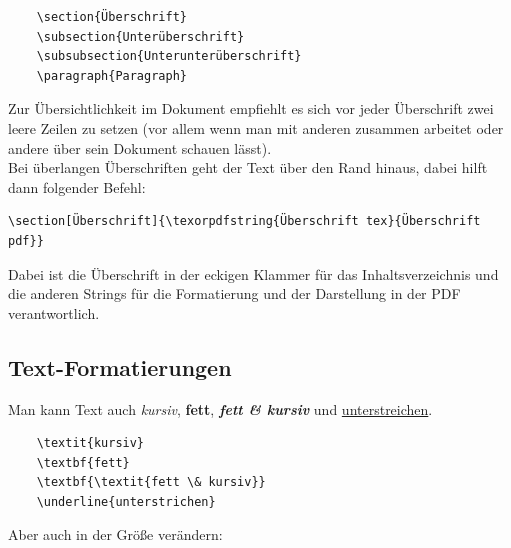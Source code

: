 \begin{verbatim}
    \section{Überschrift}
    \subsection{Unterüberschrift}
    \subsubsection{Unterunterüberschrift}
    \paragraph{Paragraph}
\end{verbatim}

Zur Übersichtlichkeit im Dokument empfiehlt es sich vor jeder Überschrift zwei leere Zeilen zu setzen (vor allem wenn man mit anderen zusammen arbeitet oder andere über sein Dokument schauen lässt).\\

Bei überlangen Überschriften geht der Text über den Rand hinaus, dabei hilft dann folgender Befehl:

\begin{verbatim}
\section[Überschrift]{\texorpdfstring{Überschrift tex}{Überschrift pdf}}
\end{verbatim}

Dabei ist die Überschrift in der eckigen Klammer für das Inhaltsverzeichnis und die anderen Strings für die Formatierung und der Darstellung in der PDF verantwortlich.


\subsection{Text-Formatierungen}

Man kann Text auch \textit{kursiv}, \textbf{fett}, \textbf{\textit{fett \& kursiv}} und \underline{unterstreichen}.

\begin{verbatim}
    \textit{kursiv}
    \textbf{fett}
    \textbf{\textit{fett \& kursiv}}
    \underline{unterstrichen}
\end{verbatim}

Aber auch in der Größe verändern:\\

